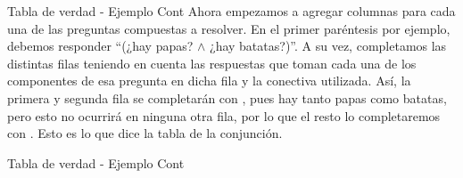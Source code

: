 \begin{frame}{Tabla de verdad - Ejemplo Cont}
  Ahora empezamos a agregar columnas para cada una de las preguntas compuestas
  a resolver. En el primer paréntesis por ejemplo, debemos responder
  ``(¿hay papas? $\land$ ¿hay batatas?)''.
  \jump
  A su vez, completamos las distintas
  filas teniendo en cuenta las respuestas que toman cada una de los componentes de
  esa pregunta en dicha fila y la conectiva utilizada.
  \jump
  Así, la primera y segunda fila se completarán con \fulltrue, pues hay tanto
  papas como batatas, pero esto no ocurrirá en ninguna otra fila, por lo que el
  resto lo completaremos con \fullfalse. Esto es lo que dice la tabla de la
  conjunción.
\end{frame}


\begin{frame}{Tabla de verdad - Ejemplo Cont}
\end{frame}


